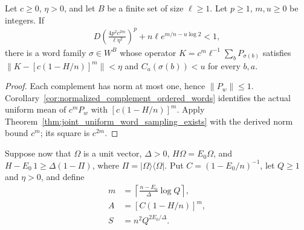 \begin{theorem}
    \label{thm:sampled_complement_power}
    \leanok
    Let $c\ge0$, $\eta>0$, and let $B$ be a finite set of size $\ell\ge1$.
    Let $p\ge1$, $m,u\ge0$ be integers. If
    \begin{align}
        D\left(\frac{4p^2c^{2m}}{\ell\eta^2}\right)^p
        +n\ell e^{m/n-u\log2}<1,
        \label{eq:sampled_complement_power_budget}
    \end{align}
    there is a word family $\sigma\in W^B$ whose operator
    $K=c^m\ell^{-1}\sum_bP_{\sigma(b)}$ satisfies
    $\|K-[c(1-H/n)]^m\|<\eta$ and $C_a(\sigma(b))<u$ for every $b,a$.
\end{theorem}
\begin{proof}\leanok
    Each complement has norm at most one, hence $\|P_w\|\le1$.
    Corollary~\ref{cor:normalized_complement_ordered_words} identifies the
    actual uniform mean of $c^mP_w$ with $[c(1-H/n)]^m$.
    Apply Theorem~\ref{thm:joint_uniform_word_sampling_exists} with the
    derived norm bound $c^m$; its square is $c^{2m}$.
\end{proof}

Suppose now that $\Omega$ is a unit vector, $\Delta>0$,
$H\Omega=E_0\Omega$, and $H-E_0\,1\ge\Delta(1-\Pi)$, where
$\Pi=|\Omega\rangle\langle\Omega|$.
Put $C=(1-E_0/n)^{-1}$, let $Q\ge1$ and $\eta>0$, and define
\begin{align}
    m & =\left\lceil\frac{n-E_0}{\Delta}\log Q\right\rceil, \\
    A & =[C(1-H/n)]^m,                                      \\
    S & =n^2Q^{2E_0/\Delta}.
    \label{eq:physical_power_sampling_parameters}
\end{align}

